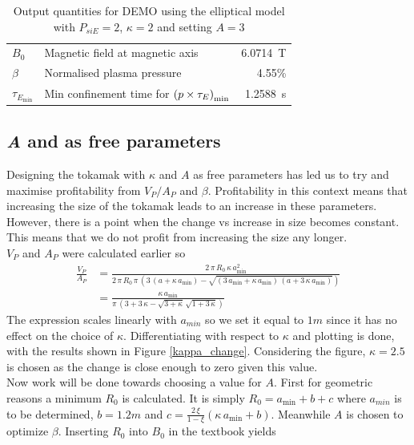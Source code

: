 \begin{table}
\begin{tabular}{llr}
		\(B_0\)                   & Magnetic field at magnetic axis                                & \SI{6.0714}{\tesla}              \\
		\(\beta\)                 & Normalised plasma pressure                                     & 4.55\%                           \\
		\(\tau_{E_\mathrm{min}}\) & Min confinement time for \(\pqty{p\times\tau_E}_\mathrm{min}\) & \SI{1.2588}{\second}             \\
		\bottomrule
	\end{tabular}
	\caption{Output quantities for DEMO using the elliptical model with $P_{si{E}}=2$, $\kappa=2$ and setting $A=3$}
	\label{tab:DEMO2}
\end{table}
\subsection{\textit{A} and \mathinhead{\kappa}{\kappa} as free parameters}
Designing the tokamak with $\kappa$ and $A$ as free parameters has led us to try and maximise profitability from $V_{P}/A_{P}$ and $\beta$. Profitability in this context means that increasing the size of the tokamak leads to an increase in these parameters. However, there is a point when the change vs increase in size becomes constant. This means that we do not profit from increasing the size any longer. \\
$V_{\si{P}}$ and $A_{\si{P}}$ were calculated earlier so
\begin{align}
	\frac{V_{\si{P}}}{A_{\si{P}}} & =\frac{2\,\pi\, R_{0}\,\kappa\, a_{\min}^{2}}{2\,\pi\, R_{0}\,\pi\, (3\,(a+\kappa\, a_{\min})-\sqrt{(3\, a_{\min}+\kappa\, a_{\min})\,(a+3\,\kappa\, a_{\min})})} \nonumber \\
	                              & =\frac{\kappa\, a_{\min}}{\pi\,(3+3\,\kappa-\sqrt{3+\kappa}\,\sqrt{1+3\,\kappa})}
\end{align}
The expression scales linearly with $a_{min}$ so we set it equal to $1\si{m}$ since it has no effect on the choice of $\kappa$. Differentiating with respect to $\kappa$ and plotting is done, with the results shown in Figure \ref{kappa_change}. Considering the figure, $\kappa=2.5$ is chosen as the change is close enough to zero given this value.\\
Now work will be done towards choosing a value for $A$. First for geometric reasons a minimum $R_{0}$ is calculated. It is simply $R_{0}=a_{\min}+b+c$ where $a_{min}$ is to be determined, $b=1.2\si{m}$ and $c=\frac{2\,\xi}{1-\xi}(\kappa\, a_{\min}+b)$. Meanwhile $A$ is chosen to optimize $\beta$. Inserting $R_{0}$ into $B_{0}$ in the textbook yields

